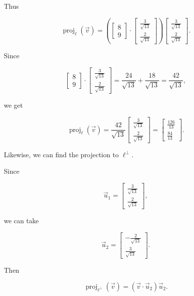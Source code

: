 Thus

\[
\operatorname{proj}_{\ell}(\vec v)
=
\left(
\begin{bmatrix}
8\\
9
\end{bmatrix}
\cdot
\begin{bmatrix}
\frac{3}{\sqrt{13}}\\[2pt]
\frac{2}{\sqrt{13}}
\end{bmatrix}
\right)
\begin{bmatrix}
\frac{3}{\sqrt{13}}\\[2pt]
\frac{2}{\sqrt{13}}
\end{bmatrix}.
\]

Since

\[
\begin{bmatrix}
8\\
9
\end{bmatrix}
\cdot
\begin{bmatrix}
\frac{3}{\sqrt{13}}\\[2pt]
\frac{2}{\sqrt{13}}
\end{bmatrix}
=
\frac{24}{\sqrt{13}}+\frac{18}{\sqrt{13}}
=
\frac{42}{\sqrt{13}},
\]

we get

\[
\operatorname{proj}_{\ell}(\vec v)
=
\frac{42}{\sqrt{13}}
\begin{bmatrix}
\frac{3}{\sqrt{13}}\\[2pt]
\frac{2}{\sqrt{13}}
\end{bmatrix}
=
\begin{bmatrix}
\frac{126}{13}\\[2pt]
\frac{84}{13}
\end{bmatrix}.
\]

Likewise, we can find the projection to $\ell^\perp$.

Since

\[
\vec u_1
=
\begin{bmatrix}
\frac{3}{\sqrt{13}}\\[2pt]
\frac{2}{\sqrt{13}}
\end{bmatrix},
\]

we can take

\[
\vec u_2
=
\begin{bmatrix}
-\frac{2}{\sqrt{13}}\\[2pt]
\frac{3}{\sqrt{13}}
\end{bmatrix}.
\]

Then

\[
\operatorname{proj}_{\ell^\perp}(\vec v)
=
(\vec v\cdot \vec u_2)\vec u_2.
\]

